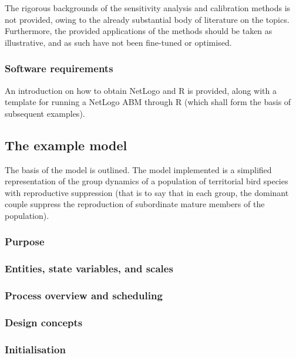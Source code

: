 The rigorous backgrounds of the sensitivity analysis and calibration methods is not provided, owing to the already substantial body of literature on the topics.
Furthermore, the provided applications of the methods should be taken as illustrative, and as such have not been fine-tuned or optimised.

\subsubsection{Software requirements}
\label{thiele:intro:software}

An introduction on how to obtain NetLogo and R is provided, along with a template for running a NetLogo ABM through R (which shall form the basis of subsequent examples).

\subsection{The example model}
\label{thiele:intro:example}

The basis of the model is outlined.
The model implemented is a simplified representation of the group dynamics of a population of territorial bird species with reproductive suppression (that is to say that in each group, the dominant couple suppress the reproduction of subordinate mature members of the population).

\subsubsection{Purpose}
\label{thiele:intro:example:purpose}

\subsubsection{Entities, state variables, and scales}
\label{thiele:intro:example:entities}

\subsubsection{Process overview and scheduling}
\label{thiele:intro:example:overview}

\subsubsection{Design concepts}
\label{thiele:intro:example:design}

\subsubsection{Initialisation}
\label{thiele:intro:example:intial}

